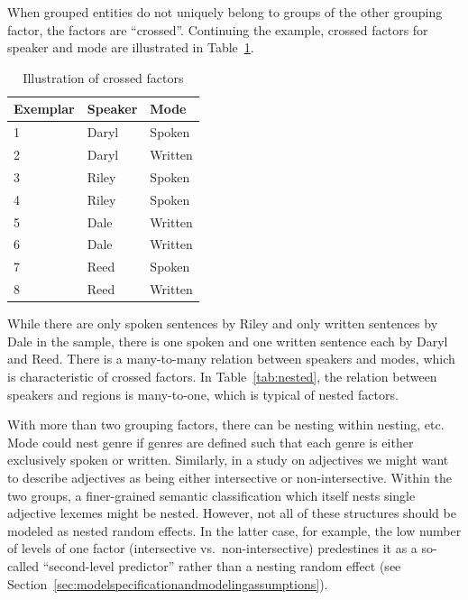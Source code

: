 When grouped entities do not uniquely belong to groups of the other grouping factor, the factors are ``crossed''.
Continuing the example, crossed factors for speaker and mode are illustrated in Table~\ref{tab:crossed}.
%
\begin{table}
  \centering
  \begin{tabular}{lll}
    \toprule
    \textbf{Exemplar} & \textbf{Speaker}  & \textbf{Mode}   \\
    \midrule
                    1 &           Daryl  &         Spoken  \\
                    2 &           Daryl  &         Written \\
                    3 &           Riley  &         Spoken  \\
                    4 &           Riley  &         Spoken  \\
                    5 &           Dale   &         Written \\
                    6 &           Dale   &         Written \\
                    7 &           Reed   &         Spoken  \\
                    8 &           Reed   &         Written \\
    \bottomrule
  \end{tabular}
  \caption{Illustration of crossed factors}
  \label{tab:crossed}
\end{table}
%
While there are only spoken sentences by Riley and only written sentences by Dale in the sample, there is one spoken and one written sentence each by Daryl and Reed.
There is a many-to-many relation between speakers and modes, which is characteristic of crossed factors.
In Table~\ref{tab:nested}, the relation between speakers and regions is many-to-one, which is typical of nested factors.

With more than two grouping factors, there can be nesting within nesting, etc.
Mode could nest genre if genres are defined such that each genre is either exclusively spoken or written.
Similarly, in a study on adjectives we might want to describe adjectives as being either intersective or non-intersective.
Within the two groups, a finer-grained semantic classification which itself nests single adjective lexemes might be nested.
However, not all of these structures should be modeled as nested random effects.
In the latter case, for example, the low number of levels of one factor (intersective vs.\ non-intersective) predestines it as a so-called ``second-level predictor'' rather than a nesting random effect (see Section~\ref{sec:modelspecificationandmodelingassumptions}).

